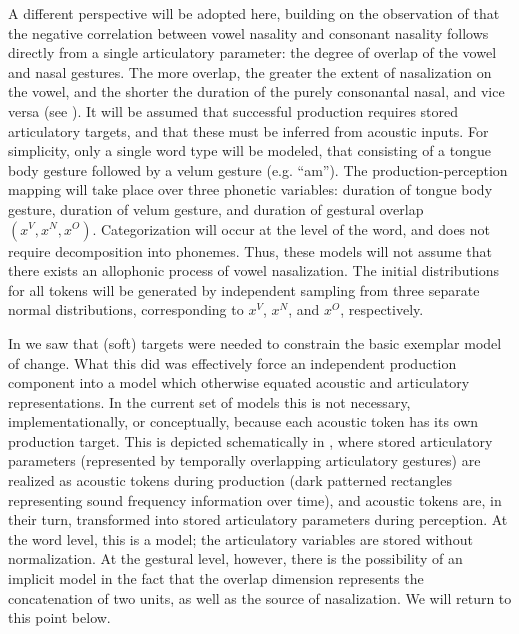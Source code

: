 A different perspective will be adopted here, building on the observation
of \citet{Beddor2009} that the negative correlation between vowel
nasality and consonant nasality follows directly from a single articulatory
parameter: the degree of overlap of the vowel and nasal gestures.
The more overlap, the greater the extent of nasalization on the vowel,
and the shorter the duration of the purely consonantal nasal, and
vice versa (see ). It will be assumed
that successful production requires stored articulatory targets, and
that these must be inferred from acoustic inputs. For simplicity,
only a single word type will be modeled, that consisting of a tongue
body gesture followed by a velum gesture (e.g. “am”). The production-perception
mapping will take place over three phonetic variables: duration of
tongue body gesture, duration of velum gesture, and duration of gestural
overlap $(x^{V},x^{N},x^{O})$. Categorization will occur at the level
of the word, and does not require decomposition into phonemes. Thus,
these models will not assume that there exists an allophonic process
of vowel nasalization. The initial distributions for all tokens will
be generated by independent sampling from three separate normal distributions,
corresponding to $x^{V}$, $x^{N}$, and $x^{O}$, respectively. 

In  we saw that (soft) targets
were needed to constrain the basic exemplar model of change. What
this did was effectively force an independent production component
into a model which otherwise equated acoustic and articulatory representations.
In the current set of models this is not necessary, implementationally,
or conceptually, because each acoustic token has its own production
target. This is depicted schematically in ,
where stored articulatory parameters (represented by temporally overlapping
articulatory gestures) are realized as acoustic tokens during production
(dark patterned rectangles representing sound frequency information
over time), and acoustic tokens are, in their turn, transformed into
stored articulatory parameters during perception. At the word level,
this is a  model; the articulatory variables are stored
without normalization. At the gestural level, however, there is the
possibility of an implicit  model in the fact that the
overlap dimension represents the concatenation of two units, as well
as the source of nasalization. We will return to this point below.


